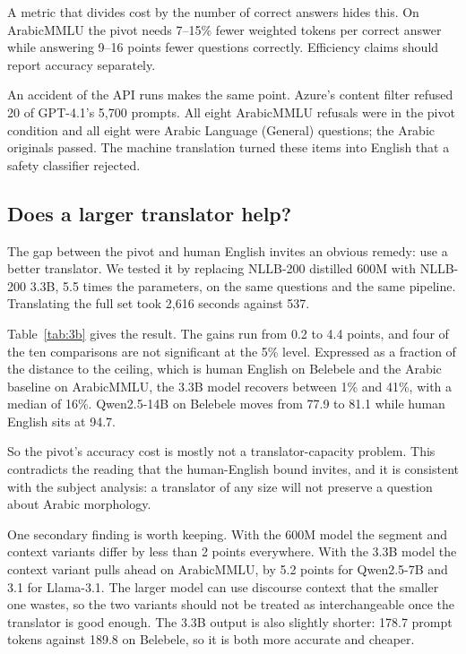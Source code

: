 \documentclass[conference,a4paper]{IEEEtran}
\begin{document}
A metric that divides cost by the number of correct answers hides this. On
ArabicMMLU the pivot needs 7--15\% fewer weighted tokens per correct answer
while answering 9--16 points fewer questions correctly. Efficiency claims
should report accuracy separately.

An accident of the API runs makes the same point. Azure's content filter
refused 20 of GPT-4.1's 5,700 prompts. All eight ArabicMMLU refusals were in
the pivot condition and all eight were Arabic Language (General) questions; the
Arabic originals passed. The machine translation turned these items into
English that a safety classifier rejected.

\subsection{Does a larger translator help?}
\label{sec:bigger}

The gap between the pivot and human English invites an obvious remedy: use a
better translator. We tested it by replacing NLLB-200 distilled 600M with
NLLB-200 3.3B, 5.5 times the parameters, on the same questions and the same
pipeline. Translating the full set took 2,616 seconds against 537.

Table~\ref{tab:3b} gives the result. The gains run from 0.2 to 4.4 points, and
four of the ten comparisons are not significant at the 5\% level. Expressed as
a fraction of the distance to the ceiling, which is human English on Belebele
and the Arabic baseline on ArabicMMLU, the 3.3B model recovers between 1\% and
41\%, with a median of 16\%. Qwen2.5-14B on Belebele moves from 77.9 to 81.1
while human English sits at 94.7.

So the pivot's accuracy cost is mostly not a translator-capacity problem. This
contradicts the reading that the human-English bound invites, and it is
consistent with the subject analysis: a translator of any size will not
preserve a question about Arabic morphology.

One secondary finding is worth keeping. With the 600M model the segment and
context variants differ by less than 2 points everywhere. With the 3.3B model
the context variant pulls ahead on ArabicMMLU, by 5.2 points for Qwen2.5-7B and
3.1 for Llama-3.1. The larger model can use discourse context that the smaller
one wastes, so the two variants should not be treated as interchangeable once
the translator is good enough. The 3.3B output is also slightly shorter: 178.7
prompt tokens against 189.8 on Belebele, so it is both more accurate and
cheaper.
\end{document}
